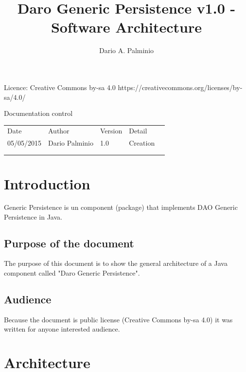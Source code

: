 \documentclass[a4paper,11pt]{book}
\title{Daro Generic Persistence v1.0 - Software Architecture}
\author{Dario A. Palminio}
\begin{document}
\maketitle
Licence: Creative Commons by-sa 4.0
\newline
https://creativecommons.org/licenses/by-sa/4.0/
\newline

Documentation control

\begin{table}[h]
\begin{tabular}{lllll}
\cline{1-4}
\multicolumn{1}{|l|}{Date}       & \multicolumn{1}{l|}{Author}         & \multicolumn{1}{l|}{Version} & \multicolumn{1}{l|}{Detail}   &  \\ \cline{1-4}
\multicolumn{1}{|l|}{05/05/2015} & \multicolumn{1}{l|}{Dario Palminio} & \multicolumn{1}{l|}{1.0}     & \multicolumn{1}{l|}{Creation} &  \\ \cline{1-4}
                                 &                                     &                              &                               &  \\
                                 &                                     &                              &                               & 
\end{tabular}
\end{table}

\tableofcontents

\chapter{Introduction}
Generic Persistence is un component (package) that implements DAO Generic Persistence in Java.

\section{Purpose of the document}
The purpose of this document is to show the general architecture of a Java component called "Daro Generic Persistence".

\section{Audience}
Because the document is public license (Creative Commons by-sa 4.0) it was written for anyone interested audience.

\chapter{Architecture}
\end{document}
